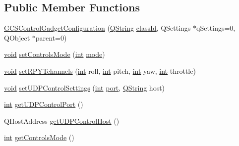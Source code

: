 \subsection*{Public Member Functions}
\begin{DoxyCompactItemize}
\item 
\hyperlink{group___g_c_s_control_gadget_plugin_ga564a596fece84d06f7a2ff0f9151d140}{G\-C\-S\-Control\-Gadget\-Configuration} (\hyperlink{group___u_a_v_objects_plugin_gab9d252f49c333c94a72f97ce3105a32d}{Q\-String} \hyperlink{group___core_plugin_gac953657221ba7fda967ada0408332641}{class\-Id}, Q\-Settings $\ast$q\-Settings=0, Q\-Object $\ast$parent=0)
\item 
\hyperlink{group___u_a_v_objects_plugin_ga444cf2ff3f0ecbe028adce838d373f5c}{void} \hyperlink{group___g_c_s_control_gadget_plugin_gaa1642ff7af92b8b9805e2f4ec1e55e05}{set\-Controls\-Mode} (\hyperlink{ioapi_8h_a787fa3cf048117ba7123753c1e74fcd6}{int} \hyperlink{glext_8h_a1e71d9c196e4683cc06c4b54d53f7ef5}{mode})
\item 
\hyperlink{group___u_a_v_objects_plugin_ga444cf2ff3f0ecbe028adce838d373f5c}{void} \hyperlink{group___g_c_s_control_gadget_plugin_ga60a55663d33c0fa8ede8a318f08fc639}{set\-R\-P\-Y\-Tchannels} (\hyperlink{ioapi_8h_a787fa3cf048117ba7123753c1e74fcd6}{int} roll, \hyperlink{ioapi_8h_a787fa3cf048117ba7123753c1e74fcd6}{int} pitch, \hyperlink{ioapi_8h_a787fa3cf048117ba7123753c1e74fcd6}{int} yaw, \hyperlink{ioapi_8h_a787fa3cf048117ba7123753c1e74fcd6}{int} throttle)
\item 
\hyperlink{group___u_a_v_objects_plugin_ga444cf2ff3f0ecbe028adce838d373f5c}{void} \hyperlink{group___g_c_s_control_gadget_plugin_ga3bcc78712b1d750a1426bd1342f0897a}{set\-U\-D\-P\-Control\-Settings} (\hyperlink{ioapi_8h_a787fa3cf048117ba7123753c1e74fcd6}{int} \hyperlink{classport}{port}, \hyperlink{group___u_a_v_objects_plugin_gab9d252f49c333c94a72f97ce3105a32d}{Q\-String} host)
\item 
\hyperlink{ioapi_8h_a787fa3cf048117ba7123753c1e74fcd6}{int} \hyperlink{group___g_c_s_control_gadget_plugin_gab4759362f125b28eca65edb170d6d179}{get\-U\-D\-P\-Control\-Port} ()
\item 
Q\-Host\-Address \hyperlink{group___g_c_s_control_gadget_plugin_ga3d756308c4f352759b919076507be2de}{get\-U\-D\-P\-Control\-Host} ()
\item 
\hyperlink{ioapi_8h_a787fa3cf048117ba7123753c1e74fcd6}{int} \hyperlink{group___g_c_s_control_gadget_plugin_ga4604101049b278a5e919fa1bcbba4a74}{get\-Controls\-Mode} ()
\item 

\end{DoxyCompactItemize}
